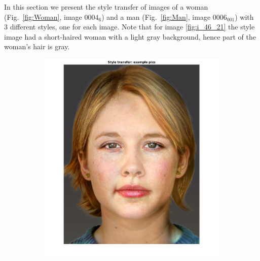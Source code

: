 \documentclass[a4paper]{iacas}
\begin{document}
In this section we present the style transfer of images of a woman (Fig.~\ref{fig:Woman}, image $0004_6$) and a man (Fig.~\ref{fig:Man}, image $0006_001$) with 3 different styles, one for each image. Note that for image \ref{fig:i_46_21} the style image had a short-haired woman with a light gray background, hence part of the woman's hair is gray.

\begin{figure}[!htbp]
	
	\begin{subfigure}[b]{0.32\textwidth}
		\includegraphics[width=\textwidth]{image_46_6.jpg}
		\caption{}
		\label{fig:i_46_6}
	\end{subfigure}
	\begin{subfigure}[b]{0.32\textwidth}

\end{subfigure}
\end{figure}
\end{document}
